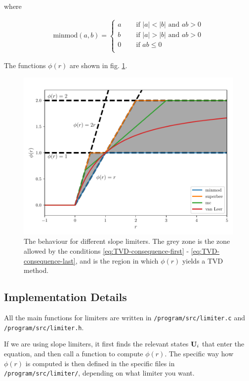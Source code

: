 where

\begin{align}
	\mathrm{minmod}(a, b) = 
		\begin{cases}
			a	& \quad \text{ if } |a| < |b| \text{ and } ab > 0\\
			b	& \quad \text{ if } |a| > |b| \text{ and } ab > 0\\
			0	& \quad \text{ if } ab \leq 0\\
		\end{cases}		
\end{align}



The functions $\phi(r)$ are shown in fig. \ref{fig:limiters-r-phi}.



\begin{figure}[H]
	\centering
	\includegraphics[width=.9\textwidth]{./figures/limiters.pdf}%
	\caption{
		\label{fig:limiters-r-phi}
		The behaviour for different slope limiters. 
		The grey zone is the zone allowed by the conditions \ref{eq:TVD-consequence-first}  - \ref{eq:TVD-consequence-last}, and is the region in which $\phi(r)$ yields a TVD method.
	}
\end{figure}
















\subsection{Implementation Details}


All the main functions for limiters are written in \texttt{/program/src/limiter.c} and \texttt{/program/src/limiter.h}.

If we are using slope limiters, it first finds the relevant states $\mathbf{U}_i$ that enter the equation, and then call a function to compute $\phi(r)$. 
The specific way how $\phi(r)$ is computed is then defined in the specific files in \texttt{/program/src/limiter/}, depending on what limiter you want.

